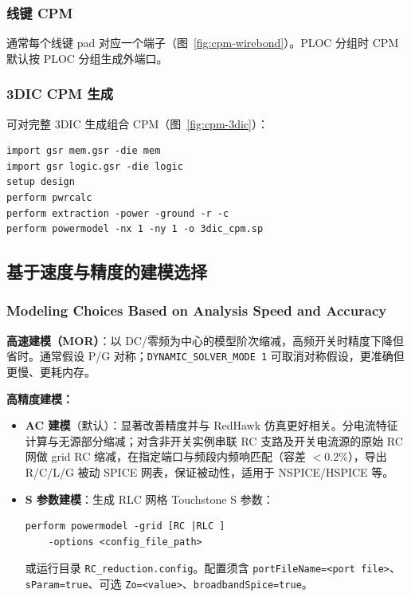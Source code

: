 
\subsubsection{线键 CPM}
通常每个线键 pad 对应一个端子（图~\ref{fig:cpm-wirebond}）。PLOC 分组时 CPM 默认按 PLOC 分组生成外端口。


\subsubsection{3DIC CPM 生成}
可对完整 3DIC 生成组合 CPM（图~\ref{fig:cpm-3dic}）：
\begin{lstlisting}
import gsr mem.gsr -die mem
import gsr logic.gsr -die logic
setup design
perform pwrcalc
perform extraction -power -ground -r -c
perform powermodel -nx 1 -ny 1 -o 3dic_cpm.sp
\end{lstlisting}


\subsection{基于速度与精度的建模选择}
\subsubsection*{Modeling Choices Based on Analysis Speed and Accuracy}

\textbf{高速建模（MOR）}：以 DC/零频为中心的模型阶次缩减，高频开关时精度下降但省时。通常假设 P/G 对称；\texttt{DYNAMIC\_SOLVER\_MODE 1} 可取消对称假设，更准确但更慢、更耗内存。

\textbf{高精度建模：}
\begin{itemize}
  \item \textbf{AC 建模}（默认）：显著改善精度并与 RedHawk 仿真更好相关。分电流特征计算与无源部分缩减；对含非开关实例串联 RC 支路及开关电流源的原始 RC 网做 grid RC 缩减，在指定端口与频段内频响匹配（容差 $<0.2\%$），导出 R/C/L/G 被动 SPICE 网表，保证被动性，适用于 NSPICE/HSPICE 等。
  \item \textbf{S 参数建模}：生成 RLC 网格 Touchstone S 参数：
\begin{lstlisting}
perform powermodel -grid [RC |RLC ]
    -options <config_file_path>
\end{lstlisting}
  或运行目录 \texttt{RC\_reduction.config}。配置须含 \texttt{portFileName=<port file>}、\texttt{sParam=true}、可选 \texttt{Zo=<value>}、\texttt{broadbandSpice=true}。
\end{itemize}

